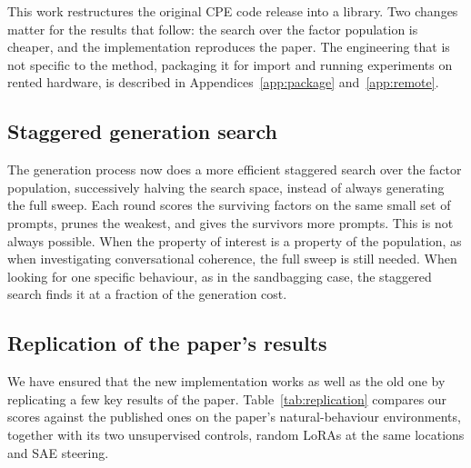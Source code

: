 This work restructures the original CPE code release \citep{mack2026} into a library.
Two changes matter for the results that follow: the search over the factor population is cheaper, and the implementation reproduces the paper.
The engineering that is not specific to the method, packaging it for import and running experiments on rented hardware, is described in Appendices~\ref{app:package} and~\ref{app:remote}.

\subsection{Staggered generation search}

The generation process now does a more efficient staggered search over the factor population, successively halving the search space, instead of always generating the full sweep.
Each round scores the surviving factors on the same small set of prompts, prunes the weakest, and gives the survivors more prompts.
This is not always possible.
When the property of interest is a property of the population, as when investigating conversational coherence, the full sweep is still needed.
When looking for one specific behaviour, as in the sandbagging case, the staggered search finds it at a fraction of the generation cost.

\subsection{Replication of the paper's results}

We have ensured that the new implementation works as well as the old one by replicating a few key results of the paper.
Table~\ref{tab:replication} compares our scores against the published ones on the paper's natural-behaviour environments, together with its two unsupervised controls, random LoRAs at the same locations and SAE steering.

\begin{table}[htbp]
  \centering
  \footnotesize
  \setlength{\tabcolsep}{4pt}
  
  \caption{%
    Replication of the CPE paper's results, its Table~1 environments and its password-locked sandbagging organism.
    Each cell gives our score with the published value in parentheses.
    Scores are the selected top-1 factor's held-out test score; base is the same run's no-adapter baseline.
    Countdown and sycophancy are accuracies, jailbreak is attack success rate, sandbagging is BigCodeBench pass rate.
    The password column is the unlocked ceiling, which only the sandbagging organism has.
    Dashes are conditions we did not run; we ran the SAE control on Llama-3.1-8B only, while the paper also
    reports one for Qwen3-8B.%
  }
  \label{tab:replication}
\end{table}

